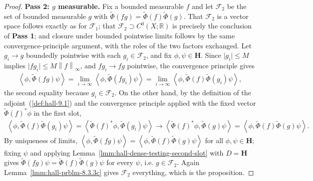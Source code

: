 \begin{proof}
\textbf{Pass 2: $g$ measurable.} Fix a bounded measurable $f$ and let $\mathcal{F}_2$ be the set of bounded measurable $g$ with $\widetilde\Phi(fg) = \widetilde\Phi(f)\widetilde\Phi(g)$. That $\mathcal{F}_2$ is a vector space follows exactly as for $\mathcal{F}_1$; that $\mathcal{F}_2 \supset C^0(X;\mathbb{R})$ is precisely the conclusion of \textbf{Pass 1}; and closure under bounded pointwise limits follows by the same convergence-principle argument, with the roles of the two factors exchanged. Let $g_i \to g$ boundedly pointwise with each $g_i \in \mathcal{F}_2$, and fix $\phi,\psi \in \mathbf{H}$. Since $\lvert g_i \rvert \le M$ implies $\lvert fg_i \rvert \le M\left\| f \right\|_\infty$, and $fg_i \to fg$ pointwise, the convergence principle gives
\begin{align}
    \left< \phi, \widetilde\Phi(fg)\psi \right> = \lim_{i\to\infty} \left< \phi, \widetilde\Phi(fg_i)\psi \right> = \lim_{i\to\infty} \left< \phi, \widetilde\Phi(f)\widetilde\Phi(g_i)\psi \right>,
\end{align}
the second equality because $g_i \in \mathcal{F}_2$. On the other hand, by the definition of the adjoint~(\ref{def:hall-9.1}) and the convergence principle applied with the fixed vector $\widetilde\Phi(f)^*\phi$ in the first slot,
\begin{align}
    \left< \phi, \widetilde\Phi(f)\widetilde\Phi(g_i)\psi \right> = \left< \widetilde\Phi(f)^*\phi, \widetilde\Phi(g_i)\psi \right> \longrightarrow \left< \widetilde\Phi(f)^*\phi, \widetilde\Phi(g)\psi \right> = \left< \phi, \widetilde\Phi(f)\widetilde\Phi(g)\psi \right>.
\end{align}
By uniqueness of limits, $\left< \phi, \widetilde\Phi(fg)\psi \right> = \left< \phi, \widetilde\Phi(f)\widetilde\Phi(g)\psi \right>$ for all $\phi,\psi \in \mathbf{H}$; fixing $\psi$ and applying Lemma~\ref{lmm:hall-dense-testing-second-slot} with $D = \mathbf{H}$ gives $\widetilde\Phi(fg)\psi = \widetilde\Phi(f)\widetilde\Phi(g)\psi$ for every $\psi$, i.e. $g \in \mathcal{F}_2$. Again Lemma~\ref{lmm:hall-prblm-8.3.3c} gives $\mathcal{F}_2$ everything, which is the proposition.
\end{proof}

